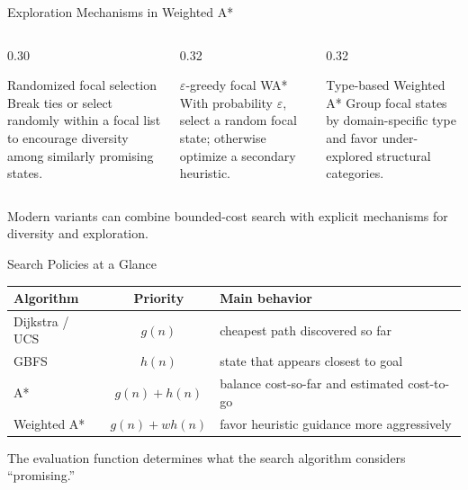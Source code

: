 \documentclass[aspectratio=169,10pt]{beamer}
\begin{document}
\begin{frame}[shrink=20]{Exploration Mechanisms in Weighted A*}
  \begin{columns}[T,onlytextwidth]
    \begin{column}{0.30\textwidth}
      \begin{block}{Randomized focal selection}
        Break ties or select randomly within a focal list to encourage diversity among similarly promising states.
      \end{block}
    \end{column}

    \begin{column}{0.32\textwidth}
      \begin{block}{$\varepsilon$-greedy focal WA*}
        With probability $\varepsilon$, select a random focal state; otherwise optimize a secondary heuristic.
      \end{block}
    \end{column}

    \begin{column}{0.32\textwidth}
      \begin{block}{Type-based Weighted A*}
        Group focal states by domain-specific type and favor under-explored structural categories.
      \end{block}
    \end{column}
  \end{columns}

  \begin{keyidea}
    Modern variants can combine bounded-cost search with explicit mechanisms for diversity and exploration.
  \end{keyidea}
\end{frame}

\begin{frame}[shrink=20]{Search Policies at a Glance}
  \begin{center}
  \renewcommand{\arraystretch}{1.35}
  \begin{tabular}{l|c|l}
    \textbf{Algorithm} & \textbf{Priority} & \textbf{Main behavior} \\\hline
    Dijkstra / UCS & $g(n)$ & cheapest path discovered so far \\
    GBFS & $h(n)$ & state that appears closest to goal \\
    A* & $g(n)+h(n)$ & balance cost-so-far and estimated cost-to-go \\
    Weighted A* & $g(n)+w h(n)$ & favor heuristic guidance more aggressively
  \end{tabular}
  \end{center}

  \begin{keyidea}
    The evaluation function determines what the search algorithm considers ``promising.''
  \end{keyidea}
\end{frame}
\end{document}
